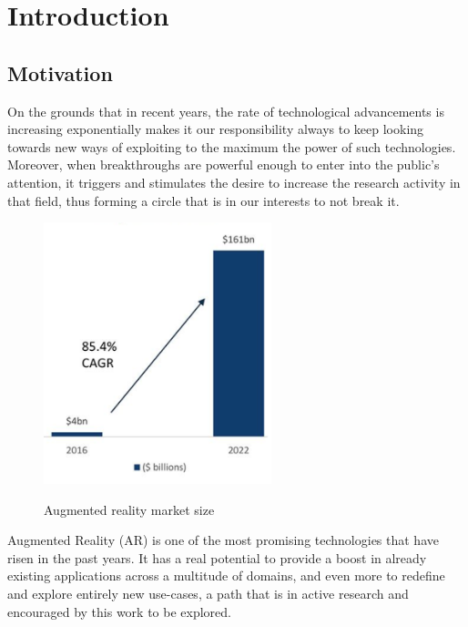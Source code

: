 \documentclass[12 pct]{report}
\begin{document}
\tableofcontents

\listoffigures

\listoftables

\chapter{Introduction}

\section{Motivation}
On the grounds that in recent years, the rate of technological advancements is increasing exponentially makes it our responsibility always to keep looking towards new ways of exploiting to the maximum the power of such technologies. 
Moreover, when breakthroughs are powerful enough to enter into the public's attention, it triggers and stimulates the desire to increase the research activity in that field, thus forming a circle that is in our interests to not break it.

\begin{figure}[H]
\includegraphics[width=0.59\textwidth]{ar-chart}
\centering
\label{fig:feature-points}
\caption{Augmented reality market size \cite{consultancy.uk}}
\end{figure}

Augmented Reality (AR) \cite{azuma2001recent} is one of the most promising technologies that have risen in the past years. 
It has a real potential to provide a boost in already existing applications across a multitude of domains, and even more to redefine and explore entirely new use-cases, a path that is in active research and encouraged by this work to be explored.
\end{document}
